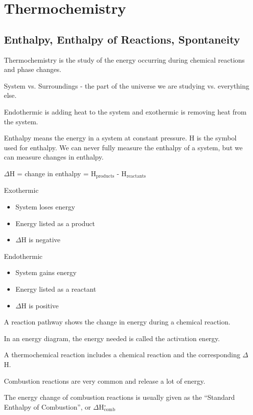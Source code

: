 \documentclass[../hchem.tex]{subfiles}
\begin{document}
\chapter{Thermochemistry}
\section{Enthalpy, Enthalpy of Reactions, Spontaneity}
Thermochemistry is the study of the energy occurring during chemical reactions and phase changes.

System vs. Surroundings - the part of the universe we are studying vs. everything else.

Endothermic is adding heat to the system and exothermic is removing heat from the system.

Enthalpy means the energy in a system at constant pressure. H is the symbol used for enthalpy. We can never fully measure the enthalpy of a system,
but we can measure changes in enthalpy.
\begin{center}
    $\Delta$H = change in enthalpy = H$_{\text{products}}$ - H$_{\text{reactants}}$
\end{center}

Exothermic  
\begin{itemize}
    \item System loses energy 
    \item Energy listed as a product 
    \item $\Delta$H is negative 
\end{itemize}

Endothermic
\begin{itemize}
    \item System gains energy 
    \item Energy listed as a reactant 
    \item $\Delta$H is positive 
\end{itemize}

A reaction pathway shows the change in energy during a chemical reaction.

In an energy diagram, the energy needed is called the activation energy.

A thermochemical reaction includes a chemical reaction and the corresponding $\Delta$H.

Combustion reactions are very common and release a lot of energy.

The energy change of combustion reactions is usually given as the ``Standard Enthalpy of Combustion'', or $\Delta$H$^{\circ}_{\text{comb}}$
\end{document}
